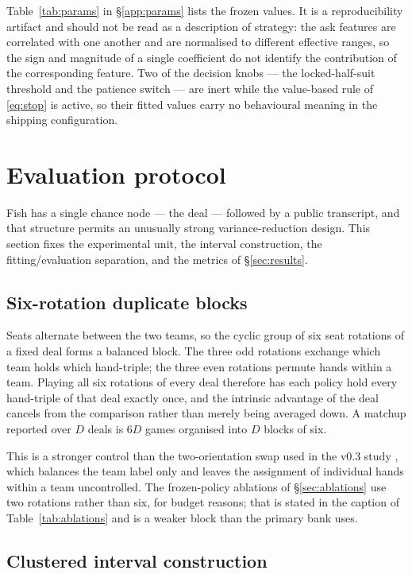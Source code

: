 \documentclass[11pt]{article}
\theoremstyle{definition}
\begin{document}
Table~\ref{tab:params} in \S\ref{app:params} lists the frozen values. It is a
reproducibility artifact and should not be read as a description of strategy: the
ask features are correlated with one another and are normalised to different
effective ranges, so the sign and magnitude of a single coefficient do not
identify the contribution of the corresponding feature. Two of the decision
knobs --- the locked-half-suit threshold and the patience switch --- are inert
while the value-based rule of \eqref{eq:stop} is active, so their fitted values
carry no behavioural meaning in the shipping configuration.
\section{Evaluation protocol}
\label{sec:protocol}

Fish has a single chance node --- the deal --- followed by a public
transcript, and that structure permits an unusually strong variance-reduction
design. This section fixes the experimental unit, the interval construction,
the fitting/evaluation separation, and the metrics of \S\ref{sec:results}.

\subsection{Six-rotation duplicate blocks}
\label{sec:protocol-blocks}

Seats alternate between the two teams, so the cyclic group of six seat
rotations of a fixed deal forms a balanced block. The three odd rotations
exchange which team holds which hand-triple; the three even rotations permute
hands within a team. Playing all six rotations of every deal therefore has
each policy hold every hand-triple of that deal exactly once, and the
intrinsic advantage of the deal cancels from the comparison rather than merely
being averaged down. A matchup reported over $D$ deals is $6D$ games organised
into $D$ blocks of six.

This is a stronger control than the two-orientation swap used in the v0.3
study \cite{fishbot03}, which balances the team label only and leaves the
assignment of individual hands within a team uncontrolled. The frozen-policy
ablations of \S\ref{sec:ablations} use two rotations rather than six, for
budget reasons; that is stated in the caption of Table~\ref{tab:ablations} and
is a weaker block than the primary bank uses.

\subsection{Clustered interval construction}
\label{sec:protocol-ci}
\end{document}
